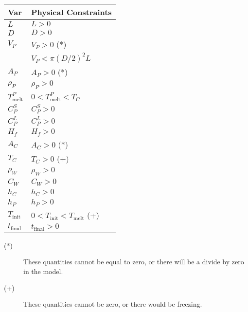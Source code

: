 \documentclass[12pt]{article}
\begin{document}
\begin{table*}
\caption{Data Constraints on Input} \label{TblInputConstraints}
\renewcommand{\arraystretch}{1.2}
\noindent \begin{longtable}{l l} 
  \toprule
  \textbf{Var} & \textbf{Physical Constraints} \\
  \midrule 
  $L$	& $L > 0$		
  \\
  $D$	& $D > 0$		
  \\
  $V_P$ & $V_P > 0$ (*)	
  \\
   & $V_P < \pi (D/2)^2 L$
  \\
  $A_P$ & $A_P > 0$ (*)	
  \\
  $\rho_P$ & $\rho_P > 0$	
  \\
  $T_\text{melt}^{P}$ 	& $0 < T_\text{melt}^{P} < T_C$
  \\
  $C_P^S$ & $C_P^S > 0$ 
  \\
  $C_P^L$ & $C_P^L > 0$ 
  \\
  $H_f$ & $H_f > 0$ 
  \\
  $A_C$ & $A_C > 0$ (*)	
  \\
  $T_C$ & $T_C > 0$ (+)	
  \\
  $\rho_W$ & $\rho_W > 0$	
  \\
  $C_W$ & $C_W > 0$	
  \\
  $h_C$ & $h_C > 0$	
  \\
  $h_P$ & $h_P > 0$	
  \\
  $T_\text{init}$ & $0 < T_\text{init} < T_\text{melt} $ (+) 
  \\
  $t_\text{final}$ & $t_\text{final} > 0$ 
  \\
  \bottomrule
\end{longtable}
\end{table*}

\noindent \begin{description}
\item[(*)] These quantities cannot be equal to zero, or there will be a divide by
  zero in the model.
\item[(+)] These quantities cannot be zero, or there would be freezing.
\end{description}
\end{document}
